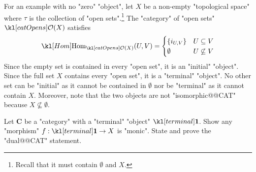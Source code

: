 \documentclass[main.tex]{subfiles}
\begin{document}
\begin{exmps}
\begin{enumerate}
		For an example with no "zero" "object", let $X$ be a non-empty "topological space" where $\tau$ is the collection of "open sets".\footnote{Recall that it must contain $\emptyset$ and $X$.} The "category" of "open sets" $\catOpens(X)$ satisfies
		\[\Hom_{\catOpens(X)}(U,V) = \begin{cases}\{i_{U,V}\} & U \subseteq V\\ \emptyset & U \not\subseteq V\end{cases}\]
		Since the empty set is contained in every "open set", it is an "initial" "object". Since the full set $X$ contains every "open set", it is a "terminal" "object". No other set can be "initial" as it cannot be contained in $\emptyset$ nor be "terminal" as it cannot contain $X$. Moreover, note that the two objects are not "isomorphic@@CAT" because $X \not\subseteq \emptyset$.
	\end{enumerate}
\end{exmps}

\begin{exer}\label{exer:duality:morterminal}
	Let $\mathbf{C}$ be a "category" with a "terminal" "object" $\terminal$. Show any "morphism" $f: \terminal \rightarrow X$ is "monic". State and prove the "dual@@CAT" statement.
\end{exer}
\end{document}
